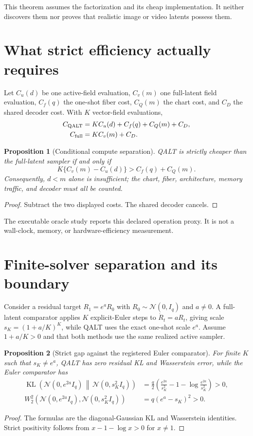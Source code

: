 \documentclass[11pt]{article}
\newtheorem{proposition}{Proposition}
\newcommand{\KL}{\operatorname{KL}}
\begin{document}
This theorem assumes the factorization and its cheap implementation.  It neither discovers them nor proves that realistic image or video latents possess them.

\section{What strict efficiency actually requires}

Let $C_u(d)$ be one active-field evaluation, $C_v(m)$ one full-latent field evaluation, $C_f(q)$ the one-shot fiber cost, $C_Q(m)$ the chart cost, and $C_D$ the shared decoder cost.  With $K$ vector-field evaluations,
\begin{align*}
 C_{\rm QALT}&=K C_u(d)+C_f(q)+C_Q(m)+C_D,\\
 C_{\rm full}&=K C_v(m)+C_D.
\end{align*}

\begin{proposition}[Conditional compute separation]
QALT is strictly cheaper than the full-latent sampler if and only if
\[
 K\{C_v(m)-C_u(d)\}>C_f(q)+C_Q(m).
\]
Consequently, $d<m$ alone is insufficient; the chart, fiber, architecture, memory traffic, and decoder must all be counted.
\end{proposition}
\begin{proof}
Subtract the two displayed costs.  The shared decoder cancels.
\end{proof}

The executable oracle study reports this declared operation proxy.  It is not a wall-clock, memory, or hardware-efficiency measurement.

\section{Finite-solver separation and its boundary}

Consider a residual target $R_1=e^aR_0$ with $R_0\sim\mathcal N(0,I_q)$ and $a\ne0$.  A full-latent comparator applies $K$ explicit-Euler steps to $\dot R_t=aR_t$, giving scale $s_K=(1+a/K)^K$, while QALT uses the exact one-shot scale $e^a$.  Assume $1+a/K>0$ and that both methods use the same realized active sampler.

\begin{proposition}[Strict gap against the registered Euler comparator]
For finite $K$ such that $s_K\ne e^a$, QALT has zero residual KL and Wasserstein error, while the Euler comparator has
\begin{align*}
 \KL\!\left(\mathcal N(0,e^{2a}I_q)\,\middle\|\,\mathcal N(0,s_K^2I_q)\right)
 &=\frac q2\left(\frac{e^{2a}}{s_K^2}-1-\log\frac{e^{2a}}{s_K^2}\right)>0,\\
 W_2^2\!\left(\mathcal N(0,e^{2a}I_q),\mathcal N(0,s_K^2I_q)\right)
 &=q(e^a-s_K)^2>0.
\end{align*}
\end{proposition}
\begin{proof}
The formulas are the diagonal-Gaussian KL and Wasserstein identities.  Strict positivity follows from $x-1-\log x>0$ for $x\ne1$.
\end{proof}
\end{document}
